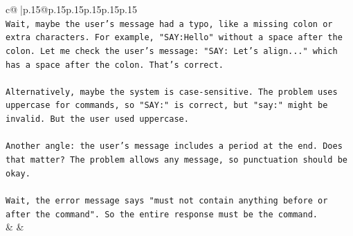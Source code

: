 \documentclass{article}
\begin{document}
{\begin{supertabular}{c@{$\;$}|p{.15\linewidth}@{}p{.15\linewidth}p{.15\linewidth}p{.15\linewidth}p{.15\linewidth}p{.15\linewidth}}
{{{\\ 
\texttt{Wait, maybe the user's message had a typo, like a missing colon or extra characters. For example, "SAY:Hello" without a space after the colon. Let me check the user's message: "SAY: Let's align..." which has a space after the colon. That's correct.} \\
\\ 
\texttt{Alternatively, maybe the system is case{-}sensitive. The problem uses uppercase for commands, so "SAY:" is correct, but "say:" might be invalid. But the user used uppercase.} \\
\\ 
\texttt{Another angle: the user's message includes a period at the end. Does that matter? The problem allows any message, so punctuation should be okay.} \\
\\ 
\texttt{Wait, the error message says "must not contain anything before or after the command". So the entire response must be the command.} \\
            }
        }
    }
    & & \\ \\


\end{supertabular}}
\end{document}

